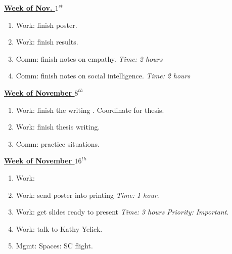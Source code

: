 \documentclass[11pt]{article}
\newcommand{\timeEst}[1]{\textit{Time:} \textit{#1}}
\newcommand{\priority}[1]{\textit{Priority:} \textit{#1}}
\begin{document}
               {\small \underline{\textbf{Week of Nov. $1^{st}$}}}
               \begin{enumerate}
                 \tiny \item \tiny Work: finish poster.
               \item \tiny Work: finish results.
               \item \tiny Comm: finish notes on empathy. \timeEst{2 hours}
               \item \tiny Comm: finish notes on social intelligence. \timeEst{2 hours}
               \end{enumerate}  
                   {\small \underline{\textbf{Week of November $8^{th}$}}}
                   \begin{enumerate}
                     \tiny \item \tiny Work: finish the writing . Coordinate for thesis.
                   \item \tiny  Work: finish thesis writing.
                   \item \tiny  Comm: practice situations.
                   \end{enumerate}
                   
          {\small \underline{\textbf{Week of November $16^{th}$}} }
          \begin{enumerate}
            \tiny \item \tiny Work:
            \tiny \item \tiny Work: send poster into printing \timeEst{1 hour}.
          \item \tiny Work: get slides ready to present \timeEst{3 hours} \priority{Important}.
          \item \tiny Work: talk to Kathy Yelick.
          \item \tiny Mgmt: Spaces: SC flight.
          \end{enumerate} 
          
\end{document}
